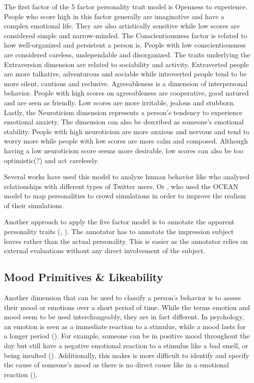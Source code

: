 The first factor of the 5 factor personality trait model is Openness to experience. People who score high in this factor generally are imaginative and have a complex emotional life. They are also artistically sensitive while low scores are considered simple and narrow-minded. The Conscientiousness factor is related to how well-organized and persistent a person is. People with low conscientiousness are considered careless, undependable and disorganized. The traits underlying the Extraversion dimension are related to sociability and activity. Extraverted people are more talkative, adventurous and sociable while introverted people tend to be more silent, cautious and reclusive. Agreeableness is a dimension of interpersonal behavior. People with high scores on agreeableness are cooperative, good natured and are seen as friendly. Low scores are more irritable, jealous and stubborn. Lastly, the Neuroticism dimension represents a person's tendency to experience emotional anxiety. The dimension can also be described as someone's emotional stability. People with high neuroticism are more anxious and nervous and tend to worry more while people with low scores are more calm and composed. Although having a low neuroticism score seems more desirable, low scores can also be too optimistic(?) and act carelessly. 

Several works have used this model to analyze human behavior like \textcite{quercia2011our} who analyzed relationships with different types of Twitter users. Or \textcite{allbeck2008creating}, who used the OCEAN model to map personalities to crowd simulations in order to improve the realism of their simulations. 

Another approach to apply the five factor model is to annotate the apparent personality traits (\cite{junior2018first}, \cite{chen2016overcoming}). The annotator has to annotate the impression subject leaves rather than the actual personality. This is easier as the annotator relies on external evaluations without any direct involvement of the subject. 

\subsection{Mood Primitives \& Likeability}
Another dimension that can be used to classify a person's behavior is to assess their mood or emotions over a short period of time. While the terms emotion and mood seem to be used interchangeably, they are in fact different. In psychology, an emotion is seen as a immediate reaction to a stimulus, while a mood lasts for a longer period (\cite{bower2000affectmemory}). For example, someone can be in positive mood throughout the day but still have a negative emotional reaction to a stimulus like a bad smell, or being insulted (\cite{matlin2012cognition}). Additionally, this makes is more difficult to identify and specify the cause of someone's mood as there is no direct cause like in a emotional reaction (\cite{desmet2016mood}).

